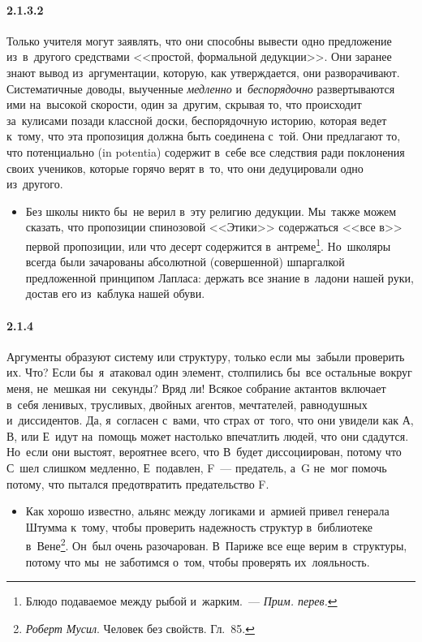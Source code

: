 \paragraph{2.1.3.2}\hypertarget{par:2.1.3.2}{} Только учителя могут заявлять, что они способны вывести одно предложение из~в~другого средствами <<простой, формальной дедукции>>. Они заранее знают вывод из~аргументации, которую, как утверждается, они разворачивают. Систематичные доводы, выученные {\itshape медленно} и~{\itshape беспорядочно} развертываются ими на~высокой скорости, один за~другим, скрывая то, что происходит за~кулисами позади классной доски, беспорядочную историю, которая ведет к~тому, что эта пропозиция должна быть соединена с~той. Они
предлагают то, что потенциально (in potentia) содержит в~себе все следствия ради поклонения своих учеников, которые горячо верят в~то, что они дедуцировали одно из~другого.
	\begin{itemize}
	\item Без школы никто бы~не верил в~эту религию дедукции. Мы~также можем сказать, что пропозиции спинозовой <<Этики>> содержаться <<все в>> первой пропозиции, или что десерт содержится в~антреме\footnote{Блюдо подаваемое между рыбой и~жарким.~--- {\itshape Прим. перев.}}. Но~школяры всегда были зачарованы абсолютной (совершенной) шпаргалкой предложенной принципом Лапласа: держать все знание в~ладони нашей руки, достав его из~каблука нашей обуви.
	\end{itemize}

\paragraph{2.1.4}\hypertarget{par:2.1.4}{} Аргументы образуют систему или структуру, только если мы~забыли проверить их. Что? Если бы~я~атаковал один элемент, столпились бы~все остальные вокруг меня, не~мешкая ни~секунды? Вряд ли! Всякое собрание актантов включает в~себя ленивых, трусливых, двойных агентов, мечтателей, равнодушных и~диссидентов. Да, я~согласен с~вами, что страх от~того, что они увидели как А, В, или Е~идут на~помощь может настолько впечатлить людей, что они сдадутся. Но~если они выстоят, вероятнее всего, что В~будет
диссоциирован, потому что С~шел слишком медленно, Е~подавлен, F~--- предатель, а~G не~мог помочь потому, что пытался предотвратить предательство F. 
	\begin{itemize}
	\item 
	Как хорошо известно, альянс между логиками и~армией привел генерала Штумма к~тому, чтобы проверить надежность структур в~библиотеке в~Вене\footnote{{\itshape Роберт Мусил}. Человек без свойств. Гл.~85.}. Он~был очень разочарован. В~Париже все еще верим в~структуры, потому что мы~не заботимся о~том, чтобы проверять их~лояльность.
	\end{itemize}

